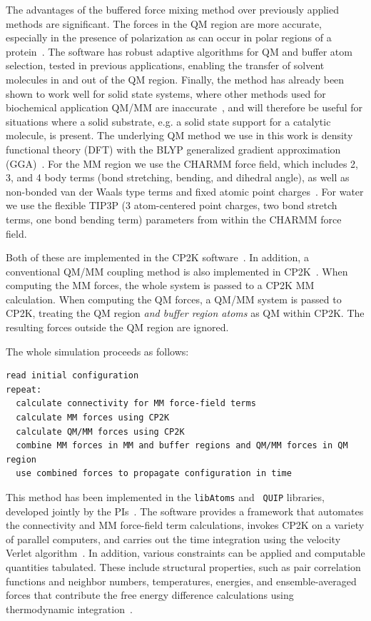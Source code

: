 \documentclass[11pt]{revtex4}
\begin{document}
The advantages of the buffered force mixing method over previously
applied methods are significant.  The forces in the QM region are
more accurate, especially in the presence of polarization as can
occur in polar regions of a protein~\cite{solt_j_phys_chem_b_2009a}.
The software has robust adaptive algorithms for QM and buffer atom
selection, tested in previous applications, enabling the transfer
of solvent molecules in and out of the QM region.  Finally, the
method has already been shown to work well for solid state systems,
where other methods used for biochemical application QM/MM are
inaccurate~\cite{bernstein_rep_prog_phys_2009a}, and will therefore
be useful for situations where a solid substrate, e.g. a solid state
support for a catalytic molecule, is present.  The underlying QM
method we use in this work is density functional theory (DFT) with
the BLYP generalized gradient approximation
(GGA)~\cite{kohn_phys_rev_1965a,becke_phys_rev_a_1988a,lee_phys_rev_b_1988a}.
For the MM region we use the CHARMM force field, which includes 2,
3, and 4 body terms (bond stretching, bending, and dihedral angle),
as well as non-bonded van der Waals type terms and fixed atomic
point charges~\cite{brooks_j_comp_chem_2009a}.  For water we use
the flexible TIP3P (3 atom-centered point charges, two bond stretch terms, one
bond bending term) parameters from within the CHARMM force field.

Both of these are implemented in the CP2K
software~\cite{vandevondele_comp_phys_comm_2005a,laino_j_chem_theor_comp_2006a,cp2k_web}.
In addition, a conventional QM/MM coupling method is also implemented
in CP2K~\cite{laio_j_chem_phys_2002a}.  When computing the MM forces,
the whole system is passed to a CP2K MM calculation.  When computing
the QM forces, a QM/MM system is passed to CP2K, treating the QM
region {\em and buffer region atoms} as QM within CP2K.  The resulting
forces outside the QM region are ignored.

The whole simulation proceeds as follows:
\begin{verbatim}
read initial configuration
repeat:
  calculate connectivity for MM force-field terms
  calculate MM forces using CP2K
  calculate QM/MM forces using CP2K
  combine MM forces in MM and buffer regions and QM/MM forces in QM region
  use combined forces to propagate configuration in time
\end{verbatim}
This method has been implemented in the {\tt libAtoms} and {\tt
QUIP} libraries, developed jointly by the PIs~\cite{libatoms_web}.
The software provides a framework that automates the connectivity
and MM force-field term calculations, invokes CP2K on a variety of
parallel computers, and carries out the time integration using the
velocity Verlet algorithm~\cite{frenkel_2002a}.  In addition, various
constraints can be applied and computable quantities tabulated.
These include structural properties, such as pair correlation
functions and neighbor numbers, temperatures, energies, and
ensemble-averaged forces that contribute the free energy difference
calculations using thermodynamic integration~\cite{frenkel_2002b}.
\end{document}
